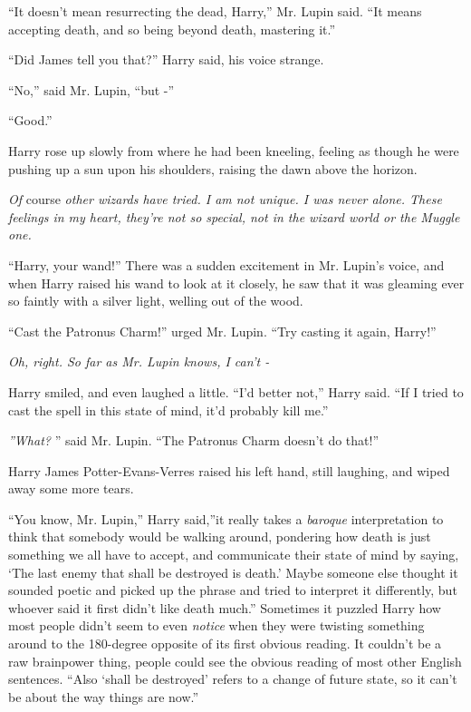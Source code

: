 ``It doesn't mean resurrecting the dead, Harry,'' Mr. Lupin said. ``It
means accepting death, and so being beyond death, mastering it.''

``Did James tell you that?'' Harry said, his voice strange.

``No,'' said Mr. Lupin, ``but -''

``Good.''

Harry rose up slowly from where he had been kneeling, feeling as though
he were pushing up a sun upon his shoulders, raising the dawn above the
horizon.

\emph{Of} course \emph{other wizards have tried. I am not unique. I was
never alone. These feelings in my heart, they're not so special, not in
the wizard world or the Muggle one.}

``Harry, your wand!'' There was a sudden excitement in Mr. Lupin's
voice, and when Harry raised his wand to look at it closely, he saw that
it was gleaming ever so faintly with a silver light, welling out of the
wood.

``Cast the Patronus Charm!'' urged Mr. Lupin. ``Try casting it again,
Harry!''

\emph{Oh, right. So far as Mr. Lupin knows, I can't -}

Harry smiled, and even laughed a little. ``I'd better not,'' Harry said.
``If I tried to cast the spell in this state of mind, it'd probably kill
me.''

\emph{''What?} '' said Mr. Lupin. ``The Patronus Charm doesn't do that!''

Harry James Potter-Evans-Verres raised his left hand, still laughing,
and wiped away some more tears.

``You know, Mr. Lupin,'' Harry said,''it really takes a \emph{baroque}
interpretation to think that somebody would be walking around, pondering
how death is just something we all have to accept, and communicate their
state of mind by saying, `The last enemy that shall be destroyed is
death.' Maybe someone else thought it sounded poetic and picked up the
phrase and tried to interpret it differently, but whoever said it first
didn't like death much.'' Sometimes it puzzled Harry how most people
didn't seem to even \emph{notice} when they were twisting something
around to the 180-degree opposite of its first obvious reading. It
couldn't be a raw brainpower thing, people could see the obvious reading
of most other English sentences. ``Also `shall be destroyed' refers to a
change of future state, so it can't be about the way things are now.''


